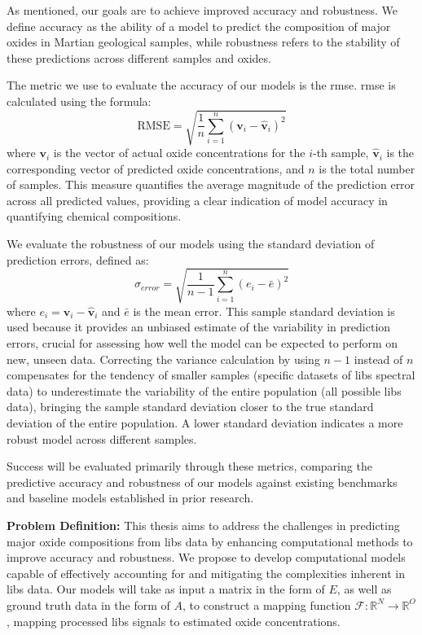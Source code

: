 As mentioned, our goals are to achieve improved accuracy and robustness.
We define accuracy as the ability of a model to predict the composition of major oxides in Martian geological samples, while robustness refers to the stability of these predictions across different samples and oxides.

The metric we use to evaluate the accuracy of our models is the \gls{rmse}. \gls{rmse} is calculated using the formula:
\[
\text{RMSE} = \sqrt{\frac{1}{n} \sum_{i=1}^{n} (\mathbf{v}_i - \hat{\mathbf{v}}_i)^2}
\]
where \( \mathbf{v}_i \) is the vector of actual oxide concentrations for the \( i \)-th sample, \( \hat{\mathbf{v}}_i \) is the corresponding vector of predicted oxide concentrations, and \( n \) is the total number of samples. This measure quantifies the average magnitude of the prediction error across all predicted values, providing a clear indication of model accuracy in quantifying chemical compositions.

We evaluate the robustness of our models using the standard deviation of prediction errors, defined as:
\[
\sigma_{error} = \sqrt{\frac{1}{n-1} \sum_{i=1}^{n} (e_i - \bar{e})^2}
\]
where \( e_i = \mathbf{v}_i - \hat{\mathbf{v}}_i \) and \( \bar{e} \) is the mean error.
This sample standard deviation is used because it provides an unbiased estimate of the variability in prediction errors, crucial for assessing how well the model can be expected to perform on new, unseen data.
Correcting the variance calculation by using \( n-1 \) instead of \( n \) compensates for the tendency of smaller samples (specific datasets of \gls{libs} spectral data) to underestimate the variability of the entire population (all possible \gls{libs} data), bringing the sample standard deviation closer to the true standard deviation of the entire population.
A lower standard deviation indicates a more robust model across different samples.

Success will be evaluated primarily through these metrics, comparing the predictive accuracy and robustness of our models against existing benchmarks and baseline models established in prior research.

\textbf{Problem Definition:} This thesis aims to address the challenges in predicting major oxide compositions from \gls{libs} data by enhancing computational methods to improve accuracy and robustness. We propose to develop computational models capable of effectively accounting for and mitigating the complexities inherent in \gls{libs} data. Our models will take as input a matrix in the form of $E$, as well as ground truth data in the form of $A$, to construct a mapping function $\mathcal{F}: \mathbb{R}^N \rightarrow \mathbb{R}^O$, mapping processed \gls{libs} signals to estimated oxide concentrations.

